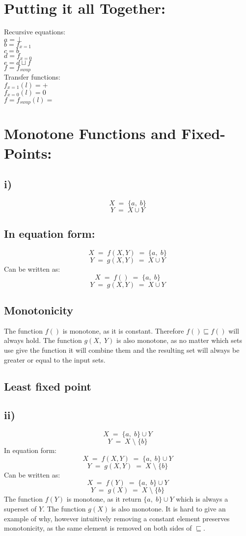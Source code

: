 \documentclass{article}
\begin{document}


\section*{Putting it all Together:}
Recursive equations:\\
$a = \bot $\\
$b = f_{x = 1}$\\
$c = b $\\
$d = f_{x = 0}$\\
$e = d \sqcup f $\\
$f = f_{swap}$\\

\noindent Transfer functions:\\
$f_{x = 1}(l) = + $\\
$f_{x = 0}(l) = 0 $\\
$f = f_{swap}(l) = $\\


\section*{Monotone Functions and Fixed-Points:}

\subsection*{i)}
$$X\;=\;\{a,\;b\}$$
$$Y\;=\;X\cup Y$$
\subsection*{In equation form:}
$$X\;=\;f(X, Y)\;=\;\{a,\;b\}$$
$$Y\;=\;g(X, Y)\;=\;X\cup Y$$
Can be written as:
$$X\;=\;f()\;=\;\{a,\;b\}$$
$$Y\;=\;g(X, Y)\;=\;X\cup Y$$
\subsection*{Monotonicity}
The function $f()$ is monotone, as it is constant. Therefore $f() \sqsubseteq f()$ will always hold. The function $g(X,\;Y)$ is also monotone, as no matter which sets use give the function it will combine them and the resulting set will always be greater or equal to the input sets.
\subsection*{Least fixed point}

\subsection*{ii)}
$$X\;=\;\{a,\;b\}\cup Y$$
$$Y\;=\;X\;\setminus\;\{b\}$$
In equation form:
$$X\;=\;f(X, Y)\;=\;\{a,\;b\}\cup Y$$
$$Y\;=\;g(X, Y)\;=\;X\;\setminus\;\{b\}$$
Can be written as:
$$X\;=\;f(Y)\;=\;\{a,\;b\}\cup Y$$
$$Y\;=\;g(X)\;=\;X\;\setminus\;\{b\}$$
The function $f(Y)$ is monotone, as it return $\{a,\;b\}\cup Y$ which is always a superset of $Y$. The function $g(X)$ is also monotone. It is hard to give an example of why, however intuitively removing a constant element preserves monotonicity, as the same element is removed on both sides of $\sqsubseteq$.
\end{document}
